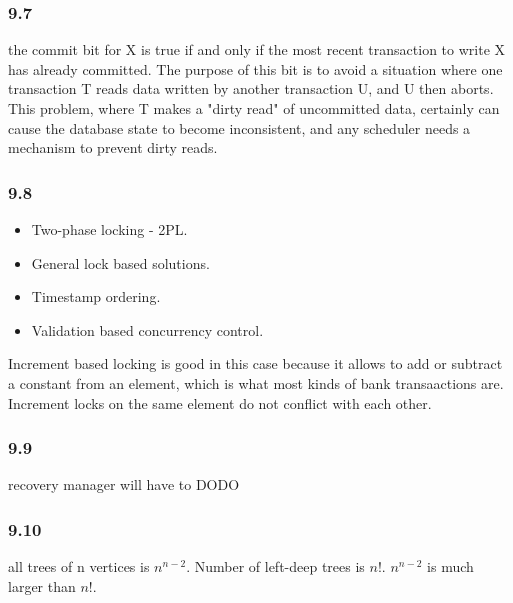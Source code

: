 \documentclass{article}
\begin{document}
\subsubsection{9.7}
the commit bit for X is true if and only if the most recent
transaction to write X has already committed. The purpose of this bit
is to avoid a situation where one transaction T reads data written by
another transaction U, and U then aborts. This problem, where T makes
a "dirty read" of uncommitted data, certainly can cause the database
state to become inconsistent, and any scheduler needs a mechanism to
prevent dirty reads.

\subsubsection{9.8}
\begin{itemize}
        \item  Two-phase locking - 2PL.
        \item General lock based solutions.
        \item Timestamp ordering.
        \item Validation based concurrency control.
\end{itemize}

Increment based locking is good in this case because it allows to add or subtract a constant
from an element, which is what most kinds of bank transaactions are. Increment locks on the same
element do not conflict with each other.
\subsubsection{9.9}
recovery manager will have to DODO
\subsubsection{9.10}
all trees of n vertices is $n^{n-2}$. Number of left-deep trees is $n!$.
$n^{n-2}$ is much larger than $n!$.
\end{document}

